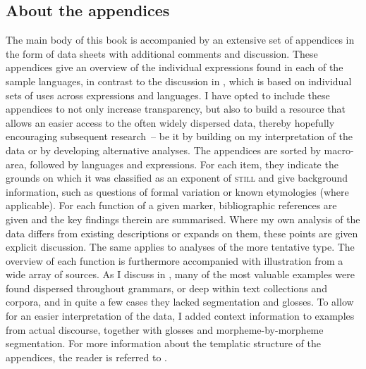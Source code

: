 \subsection{About the appendices}
\label{sectionAboutAppendices}
The main body of this book is accompanied by an extensive set of appendices in the form of data sheets with additional comments and discussion. These appendices give an overview of the individual expressions found in each of the sample languages, in contrast to the discussion in , which is based on individual sets of uses across expressions and languages. I have opted to include these appendices to not only increase transparency, but also to build a resource that allows an easier access to the often widely dispersed data, thereby hopefully encouraging subsequent research~-- be it by building on my interpretation of the data or by developing alternative analyses. The appendices are sorted by macro-area, followed by languages and expressions. For each item, they indicate the grounds on which it was classified as an exponent of \textsc{still} and give background information, such as questions of formal variation or known etymologies (where applicable). For each function of a given marker, bibliographic references are given and the key findings therein are summarised. Where my own analysis of the data differs from existing descriptions or expands on them, these points are given explicit discussion. The same applies to analyses of the more tentative type. The overview of each function is furthermore accompanied with illustration from a wide array of sources. As I discuss in , many of the most valuable examples were found dispersed throughout grammars, or deep within text collections and corpora, and in quite a few cases they lacked segmentation and glosses. To allow for an easier interpretation of the data, I added context information to examples from actual discourse, together with glosses and morpheme-by-morpheme segmentation. For more information about the templatic structure of the appendices, the reader is referred to .
